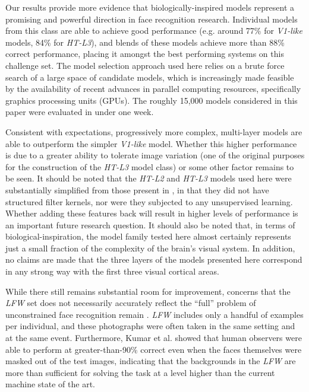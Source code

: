 
Our results provide more evidence that biologically-inspired models represent a promising
and powerful direction in face recognition research. Individual models from this
class are able to achieve good performance (e.g. around 77\% for \emph{V1-like} models,
84\% for \emph{HT-L3}), and blends of these models achieve more than 88\%
correct performance, placing it amongst the best performing systems on this challenge set.  
The model selection approach used here relies on a brute force search of a large space of candidate models, which is increasingly made feasible by the availability of recent advances in parallel computing resources, specifically graphics processing units (GPUs).  The roughly 15,000 models considered in this paper were evaluated in under one week.

Consistent with expectations, progressively more complex, multi-layer models are
able to outperform the simpler \emph{V1-like} model. Whether this higher
performance is due to a greater ability to tolerate image variation (one of the
original purposes for the construction of the \emph{HT-L3} model
class\cite{pinto:plos09}) or some other factor remains to be seen. It should be
noted that the \emph{HT-L2} and \emph{HT-L3} models used here were substantially
simplified from those present in \cite{pinto:plos09}, in that they did not have
structured filter kernels, nor were they subjected to any unsupervised learning.
Whether adding these features back will result in higher levels of performance
is an important future research question.  It should also be noted that, in terms of biological-inspiration, the model family tested here almost certainly represents just a small fraction of the complexity of the brain's visual system.  In addition, no claims are made that the three layers of the models presented here correspond in any strong way with the first three visual cortical areas.

While there still remains substantial room for improvement, concerns that
the \emph{LFW} set does not necessarily accurately reflect the ``full'' problem
of unconstrained face recognition
remain \cite{pinto:eccv08,pinto:cvpr09,kumar:iccv09}.  \emph{LFW} includes only
a handful of examples per individual, and these photographs were often taken in
the same setting and at the same event.  Furthermore, Kumar et
al. \cite{kumar:iccv09} showed that human observers were able to perform at
greater-than-90\% correct even when the faces themselves were masked out of the
test images, indicating that the backgrounds in the \emph{LFW} are more than
sufficient for solving the task at a level higher than the current machine state
of the art.

